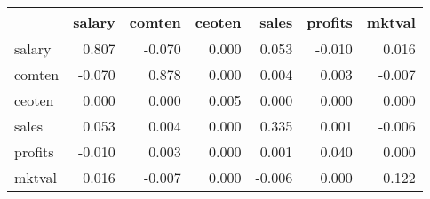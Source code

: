 \begin{tabular}{lrrrrrr}
\toprule
 & salary & comten & ceoten & sales & profits & mktval \\ 
\midrule\addlinespace[2.5pt]
salary & 0.807 & -0.070 & 0.000 & 0.053 & -0.010 & 0.016 \\ 
comten & -0.070 & 0.878 & 0.000 & 0.004 & 0.003 & -0.007 \\ 
ceoten & 0.000 & 0.000 & 0.005 & 0.000 & 0.000 & 0.000 \\ 
sales & 0.053 & 0.004 & 0.000 & 0.335 & 0.001 & -0.006 \\ 
profits & -0.010 & 0.003 & 0.000 & 0.001 & 0.040 & 0.000 \\ 
mktval & 0.016 & -0.007 & 0.000 & -0.006 & 0.000 & 0.122 \\ 
\bottomrule
\end{tabular}

